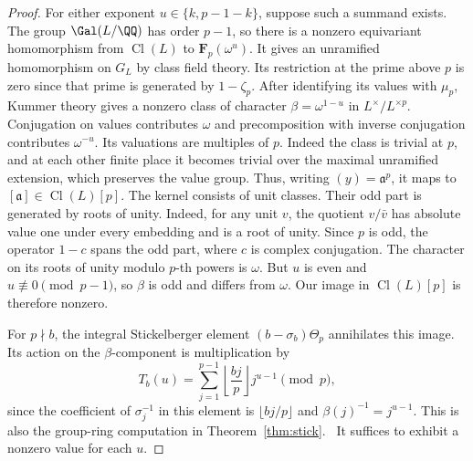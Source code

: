 \documentclass[a4paper,11pt]{article}
\theoremstyle{definition}
\theoremstyle{remark}
\numberwithin{equation}{section}
\newcommand{\Cl}{\operatorname{Cl}}
\begin{document}
\begin{proof}
For either exponent \(u\in\{k,p-1-k\}\), suppose such a summand
exists. The group \(\Gal(L/\QQ)\) has order \(p-1\), so there is a
nonzero equivariant homomorphism from \(\Cl(L)\) to
\(\mathbf F_p(\omega^u)\). It gives an unramified homomorphism
on \(G_L\) by class field theory. Its restriction at the prime
above \(p\) is zero since that prime is generated by \(1-\zeta_p\).
After identifying its values with \(\mu_p\), Kummer theory gives
a nonzero class of character \(\beta=\omega^{1-u}\) in
\(L^\times/L^{\times p}\). Conjugation on values contributes
\(\omega\) and precomposition with inverse conjugation contributes
\(\omega^{-u}\). Its valuations are multiples of \(p\).
Indeed the class is trivial at \(p\), and at each other finite
place it becomes trivial over the maximal unramified extension,
which preserves the value group. Thus, writing \((y)=\mathfrak a^p\),
it maps to \([\mathfrak a]\in\Cl(L)[p]\). The kernel consists of
unit classes. Their odd part is generated by roots of unity. Indeed,
for any unit \(v\), the quotient \(v/\bar v\) has absolute value
one under every embedding and is a root of unity. Since \(p\) is
odd, the operator \(1-c\) spans the odd part, where \(c\) is
complex conjugation. The character on its roots of unity modulo
\(p\)-th powers is \(\omega\). But \(u\) is even and
\(u\not\equiv0\pmod{p-1}\), so \(\beta\) is odd and differs from
\(\omega\). Our image in \(\Cl(L)[p]\) is therefore nonzero.

For \(p\nmid b\), the integral Stickelberger element
\((b-\sigma_b)\Theta_p\) annihilates this image. Its action
on the \(\beta\)-component is multiplication by
\begin{equation}
 T_b(u)=\sum_{j=1}^{p-1}\left\lfloor\frac{bj}{p}\right\rfloor
                        j^{u-1}\pmod p ,
 \label{eq:res195}
\end{equation}
since the coefficient of \(\sigma_j^{-1}\) in this element is
\(\lfloor bj/p\rfloor\) and \(\beta(j)^{-1}=j^{u-1}\).
This is also the group-ring computation in
Theorem~\ref{thm:stick}.~\cite[Ch.~6]{V-III-V-stick}
It suffices to exhibit a nonzero value for each \(u\).


\end{proof}
\end{document}
